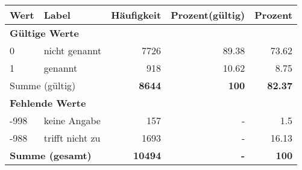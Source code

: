      \begin{longtable}{lXrrr}
     \toprule
     \textbf{Wert} & \textbf{Label} & \textbf{Häufigkeit} & \textbf{Prozent(gültig)} & \textbf{Prozent} \\
     \endhead
     \midrule
     \multicolumn{5}{l}{\textbf{Gültige Werte}}\\

     0 &
     \multicolumn{1}{X}{ nicht genannt   } &


       \num{7726} &
       \num[round-mode=places,round-precision=2]{89,38} &
         \num[round-mode=places,round-precision=2]{73,62} \\

     1 &
     \multicolumn{1}{X}{ genannt   } &


       \num{918} &
       \num[round-mode=places,round-precision=2]{10,62} &
         \num[round-mode=places,round-precision=2]{8,75} \\
     \midrule
     \multicolumn{2}{l}{Summe (gültig)} &
       \textbf{\num{8644}} &
     \textbf{100} &
       \textbf{\num[round-mode=places,round-precision=2]{82,37}} \\
     \multicolumn{5}{l}{\textbf{Fehlende Werte}}\\
       -998 &
       keine Angabe &
         \num{157} &
        - &
         \num[round-mode=places,round-precision=2]{1,5} \\
       -988 &
       trifft nicht zu &
         \num{1693} &
        - &
         \num[round-mode=places,round-precision=2]{16,13} \\
     \midrule
     \multicolumn{2}{l}{\textbf{Summe (gesamt)}} &
          \textbf{\num{10494}} &
        \textbf{-} &
        \textbf{100} \\
     \bottomrule
     \end{longtable}
     
